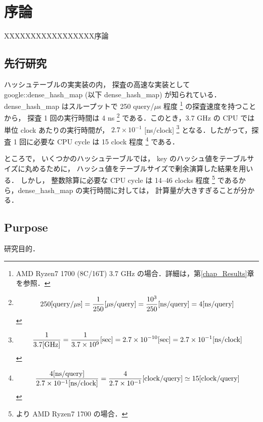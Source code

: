 \chapter{序論}
\label{chap_Introduction}

XXXXXXXXXXXXXXXXX序論

\section{先行研究}
ハッシュテーブルの実実装の内，
探査の高速な実装として google::dense\_hash\_map (以下 dense\_hash\_map) が知られている．
dense\_hash\_map はスループットで 250 query/$\mu$s 程度
\footnote{AMD Ryzen7 1700 (8C/16T) 3.7 GHz の場合．詳細は，第\ref{chap_Results}章を参照．}
の探査速度を持つことから，
探査 1 回の実行時間は 4 ns
\footnote{
  \begin{align*}
    250{\rm [query \slash \mu s]}
    = \frac{1}{250} {\rm [\mu s \slash query]}
    = \frac{10^3}{250} {\rm [ns \slash query]}
    = 4 {\rm [ns \slash query]}
  \end{align*}
}
である．このとき，3.7 GHz の CPU では単位 clock あたりの実行時間が，
$2.7 \times 10^{-1}$ [ns/clock]
\footnote{
  \begin{align*}
    \frac{1}{3.7 {\rm [GHz]}}
    = \frac{1}{3.7 \times 10^9}{\rm [sec]}
    = 2.7 \times 10^{-10}{\rm [sec]}
    = 2.7 \times 10^{-1}{\rm [ns/clock]}
  \end{align*}
}
となる．したがって，探査 1 回に必要な CPU cycle は
15 clock 程度
\footnote{
  \begin{align*}
    \frac{ 4 {\rm [ns/query]} }{ 2.7 \times 10^{-1} {\rm [ns/clock]} }
    = \frac{ 4 }{ 2.7 \times 10^{-1} } {\rm [clock/query]}
    \simeq 15 {\rm [clock/query]}
  \end{align*}
}
である．

ところで，
いくつかのハッシュテーブルでは，
key のハッシュ値をテーブルサイズに丸めるために，
ハッシュ値をテーブルサイズで剰余演算した結果を用いる．
しかし，
整数除算に必要な CPU cycle は 14--46 clocks 程度
\footnote{
  \cite{AgnerFog2018}より AMD Ryzen7 1700 の場合．
}
であるから，dense\_hash\_map の実行時間に対しては，
計算量が大きすぎることが分かる．







\section{Purpose}
研究目的．

